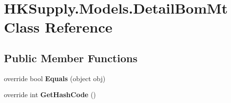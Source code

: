 \hypertarget{class_h_k_supply_1_1_models_1_1_detail_bom_mt}{}\section{H\+K\+Supply.\+Models.\+Detail\+Bom\+Mt Class Reference}
\label{class_h_k_supply_1_1_models_1_1_detail_bom_mt}
\subsection*{Public Member Functions}
\begin{DoxyCompactItemize}
\item 
\mbox{\label{class_h_k_supply_1_1_models_1_1_detail_bom_mt_ab79fe1948be3cf2562da976663711235}} 
override bool {\bfseries Equals} (object obj)
\item 
\mbox{\label{class_h_k_supply_1_1_models_1_1_detail_bom_mt_a09e035caa47cdb38e7571f90c8641354}} 
override int {\bfseries Get\+Hash\+Code} ()
\end{DoxyCompactItemize}
